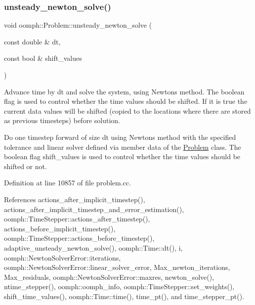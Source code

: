 \subsubsection{\texorpdfstring{unsteady\+\_\+newton\+\_\+solve()}{unsteady\_newton\_solve()}\hspace{0.1cm}{\footnotesize\ttfamily [2/3]}}
{\footnotesize\ttfamily void oomph\+::\+Problem\+::unsteady\+\_\+newton\+\_\+solve (\begin{DoxyParamCaption}\item[{const double \&}]{dt,  }\item[{const bool \&}]{shift\+\_\+values }\end{DoxyParamCaption})}



Advance time by dt and solve the system, using Newton\textquotesingle{}s method. The boolean flag is used to control whether the time values should be shifted. If it is true the current data values will be shifted (copied to the locations where there are stored as previous timesteps) before solution. 

Do one timestep forward of size dt using Newton\textquotesingle{}s method with the specified tolerance and linear solver defined via member data of the \hyperlink{classoomph_1_1Problem}{Problem} class. The boolean flag shift\+\_\+values is used to control whether the time values should be shifted or not. 

Definition at line 10857 of file problem.\+cc.



References actions\+\_\+after\+\_\+implicit\+\_\+timestep(), actions\+\_\+after\+\_\+implicit\+\_\+timestep\+\_\+and\+\_\+error\+\_\+estimation(), oomph\+::\+Time\+Stepper\+::actions\+\_\+after\+\_\+timestep(), actions\+\_\+before\+\_\+implicit\+\_\+timestep(), oomph\+::\+Time\+Stepper\+::actions\+\_\+before\+\_\+timestep(), adaptive\+\_\+unsteady\+\_\+newton\+\_\+solve(), oomph\+::\+Time\+::dt(), i, oomph\+::\+Newton\+Solver\+Error\+::iterations, oomph\+::\+Newton\+Solver\+Error\+::linear\+\_\+solver\+\_\+error, Max\+\_\+newton\+\_\+iterations, Max\+\_\+residuals, oomph\+::\+Newton\+Solver\+Error\+::maxres, newton\+\_\+solve(), ntime\+\_\+stepper(), oomph\+::oomph\+\_\+info, oomph\+::\+Time\+Stepper\+::set\+\_\+weights(), shift\+\_\+time\+\_\+values(), oomph\+::\+Time\+::time(), time\+\_\+pt(), and time\+\_\+stepper\+\_\+pt().

\mbox{\label{classoomph_1_1Problem_af26bd71c24ba99c9391d6e932b68e5e8}} 

